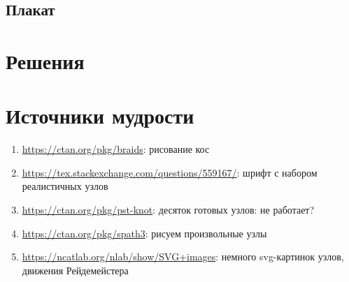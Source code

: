 \documentclass[12pt]{article}
\theoremstyle{definition}
\begin{document}
\subsection{Плакат}






\renewenvironment{solution}[1]{%
         \vskip .5cm plus 2cm minus 0.1cm%
         {\bfseries \hyperlink{problem:#1}{#1.}}%
}%
{%
}%



\section{Решения}



\section{Источники мудрости}


\begin{enumerate}
\item \url{https://ctan.org/pkg/braids}: рисование кос
\item \url{https://tex.stackexchange.com/questions/559167/}: шрифт с набором реалистичных узлов
\item \url{https://ctan.org/pkg/pst-knot}: десяток готовых узлов: не работает?
\item \url{https://ctan.org/pkg/spath3}: рисуем произвольные узлы
\item \url{https://ncatlab.org/nlab/show/SVG+images}: немного svg-картинок узлов, движения Рейдемейстера
\end{enumerate}

\printbibliography[heading=none]
\end{document}
